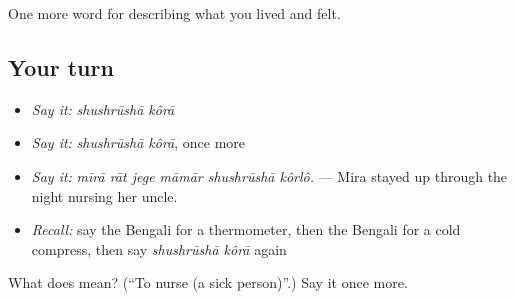 \begin{grammarlens}[title={What you've built}]
One more word for describing what you lived and felt.
\end{grammarlens}

\subsection*{Your turn}
\begin{itemize}
\raggedright
  \item \emph{Say it:} \emph{shushrūshā kôrā}
  \item \emph{Say it:} \emph{shushrūshā kôrā}, once more
  \item \emph{Say it:} \emph{mīrā rāt jege māmār shushrūshā kôrlô.} — Mira stayed up through the night nursing her uncle.
  \item \emph{Recall:} say the Bengali for a thermometer, then the Bengali for a cold compress, then say \emph{shushrūshā kôrā} again
\end{itemize}

\begin{tcolorbox}[breakable,colback=teal!4,colframe=teal!35!black,title={Before you move on}]
What does   mean? (\textquotedblleft{}To nurse (a sick person)\textquotedblright{}.) Say it once more.
\end{tcolorbox}
